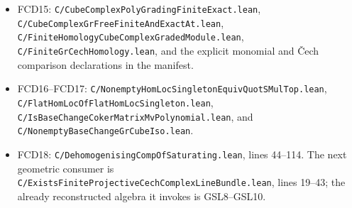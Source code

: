 \begin{itemize}
\texttt{C/\allowbreak{}Finite\allowbreak{}Quot\allowbreak{}SMul\allowbreak{}Top\allowbreak{}XSub\allowbreak{}One\allowbreak{}Of\allowbreak{}Chart.lean}, and
\texttt{C/\allowbreak{}Dehomogenising\allowbreak{}Comp\allowbreak{}Of\allowbreak{}Saturating.lean}, lines 22--42.
\item FCD15:
\texttt{C/\allowbreak{}Cube\allowbreak{}Complex\allowbreak{}Poly\allowbreak{}Grading\allowbreak{}Finite\allowbreak{}Exact.lean},
\texttt{C/\allowbreak{}Cube\allowbreak{}Complex\allowbreak{}Gr\allowbreak{}Free\allowbreak{}Finite\allowbreak{}And\allowbreak{}Exact\allowbreak{}At.lean},
\texttt{C/\allowbreak{}Finite\allowbreak{}Homology\allowbreak{}Cube\allowbreak{}Complex\allowbreak{}Graded\allowbreak{}Module.lean},
\texttt{C/\allowbreak{}Finite\allowbreak{}Gr\allowbreak{}Cech\allowbreak{}Homology.lean}, and the explicit monomial
and \v Cech comparison declarations in the manifest.
\item FCD16--FCD17:
\texttt{C/\allowbreak{}Nonempty\allowbreak{}Hom\allowbreak{}Loc\allowbreak{}Singleton\allowbreak{}Equiv\allowbreak{}Quot\allowbreak{}SMul\allowbreak{}Top.lean},
\texttt{C/\allowbreak{}Flat\allowbreak{}Hom\allowbreak{}Loc\allowbreak{}Of\allowbreak{}Flat\allowbreak{}Hom\allowbreak{}Loc\allowbreak{}Singleton.lean},
\texttt{C/\allowbreak{}Is\allowbreak{}Base\allowbreak{}Change\allowbreak{}Coker\allowbreak{}Matrix\allowbreak{}Mv\allowbreak{}Polynomial.lean}, and
\texttt{C/\allowbreak{}Nonempty\allowbreak{}Base\allowbreak{}Change\allowbreak{}Gr\allowbreak{}Cube\allowbreak{}Iso.lean}.
\item FCD18:
\texttt{C/\allowbreak{}Dehomogenising\allowbreak{}Comp\allowbreak{}Of\allowbreak{}Saturating.lean}, lines 44--114.
The next geometric consumer is
\texttt{C/\allowbreak{}Exists\allowbreak{}Finite\allowbreak{}Projective\allowbreak{}Cech\allowbreak{}Complex\allowbreak{}Line\allowbreak{}Bundle.lean},
lines 19--43; the already reconstructed algebra it invokes is
GSL8--GSL10.
\end{itemize}
